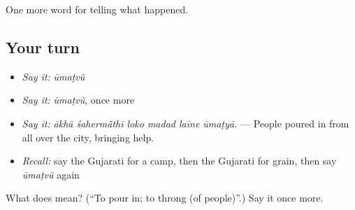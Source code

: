 \begin{grammarlens}[title={What you've built}]
One more word for telling what happened.
\end{grammarlens}

\subsection*{Your turn}
\begin{itemize}
\raggedright
  \item \emph{Say it:} \emph{ūmaṭvũ}
  \item \emph{Say it:} \emph{ūmaṭvũ}, once more
  \item \emph{Say it:} \emph{ākhā śahermā̃thī loko madad laīne ūmaṭyā.} — People poured in from all over the city, bringing help.
  \item \emph{Recall:} say the Gujarati for a camp, then the Gujarati for grain, then say \emph{ūmaṭvũ} again
\end{itemize}

\begin{tcolorbox}[breakable,colback=teal!4,colframe=teal!35!black,title={Before you move on}]
What does  mean? (\textquotedblleft{}To pour in; to throng (of people)\textquotedblright{}.) Say it once more.
\end{tcolorbox}

